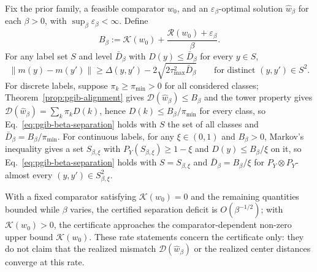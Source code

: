 \begin{corollary}
\label{cor:pgib-beta-transfer}
Fix the prior family, a feasible comparator $w_0$, and an
$\varepsilon_\beta$-optimal solution $\widehat w_\beta$ for each $\beta>0$, with
$\sup_\beta\varepsilon_\beta<\infty$. Define
\begin{equation}
B_\beta:=\mathcal K(w_0)+\frac{\mathcal R(w_0)+\varepsilon_\beta}{\beta}.
\label{eq:pgib-beta-budget}
\end{equation}
For any label set $S$ and level $\bar D_\beta$ with $D(y)\le\bar D_\beta$ for every
$y\in S$,
\begin{equation}
\|m(y)-m(y')\|
\ge \Delta(y,y')-2\sqrt{2\tau_{\max}^2\bar D_\beta}
\qquad\text{for distinct } (y,y')\in S^2.
\label{eq:pgib-beta-separation}
\end{equation}
For discrete labels, suppose $\pi_k\ge\pi_{\min}>0$ for all considered classes;
Theorem~\ref{prop:pgib-alignment} gives $\mathcal D(\widehat w_\beta)\le B_\beta$
and the tower property gives $\mathcal D(\widehat w_\beta)=\sum_k\pi_kD(k)$, hence
$D(k)\le B_\beta/\pi_{\min}$ for every class, so
Eq.~\eqref{eq:pgib-beta-separation} holds with $S$ the set of all classes and
$\bar D_\beta=B_\beta/\pi_{\min}$. For continuous labels, for any $\xi\in(0,1)$
and $B_\beta>0$, Markov's inequality gives a set $S_{\beta,\xi}$ with
$P_Y(S_{\beta,\xi})\ge 1-\xi$ and $D(y)\le B_\beta/\xi$ on it, so
Eq.~\eqref{eq:pgib-beta-separation} holds with $S=S_{\beta,\xi}$ and
$\bar D_\beta=B_\beta/\xi$ for $P_Y\otimes P_Y$-almost every
$(y,y')\in S_{\beta,\xi}^2$.


With a fixed comparator satisfying $\mathcal K(w_0)=0$ and the remaining quantities
bounded while $\beta$ varies, the certified separation deficit is
$O(\beta^{-1/2})$; with $\mathcal K(w_0)>0$, the certificate approaches the
comparator-dependent non-zero upper bound $\mathcal K(w_0)$. These rate statements
concern the certificate only: they do not claim that the realized mismatch
$\mathcal D(\widehat w_\beta)$ or the realized center distances converge at this
rate.
\end{corollary}
